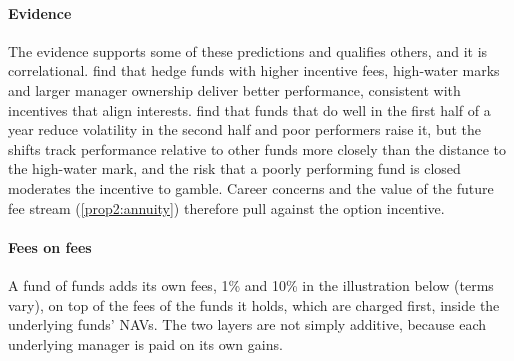 \begin{chapterrefs}
\paragraph{Evidence}
The evidence supports some of these predictions and qualifies others, and it is correlational. \textcite{agarwal2009} find that
hedge funds with higher incentive fees, high-water marks and larger manager ownership deliver better
performance, consistent with incentives that align interests. \textcite{brown2001} find that funds
that do well in the first half of a year reduce volatility in the second half and poor performers
raise it, but the shifts track performance relative to other funds more closely than the distance to
the high-water mark, and the risk that a poorly performing fund is closed moderates the incentive to
gamble. Career concerns and the value of the future fee stream (\cref{prop2:annuity}) therefore pull
against the option incentive.

\paragraph{Fees on fees}
A fund of funds adds its own fees, 1\% and 10\% in the illustration below (terms vary), on top of the
fees of the funds it holds, which are charged first, inside the underlying funds' NAVs.
The two layers are not simply additive, because each underlying manager is paid on its own gains.


\end{chapterrefs}
